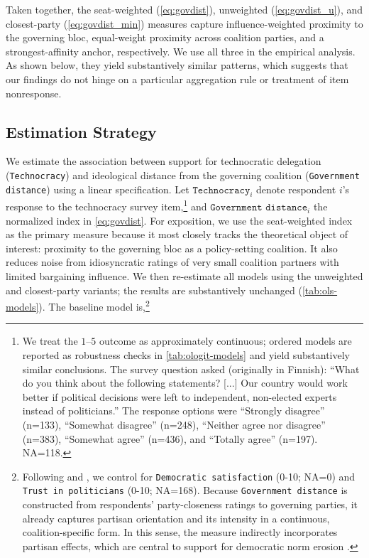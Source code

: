 \documentclass[11pt]{article}\usepackage[]{graphicx}\usepackage[]{xcolor}
\begin{document}
Taken together, the seat-weighted (\autoref{eq:govdist}), unweighted (\autoref{eq:govdist_u}), and closest-party (\autoref{eq:govdist_min}) measures capture influence-weighted proximity to the governing bloc, equal-weight proximity across coalition parties, and a strongest-affinity anchor, respectively. We use all three in the empirical analysis. As shown below, they yield substantively similar patterns, which suggests that our findings do not hinge on a particular aggregation rule or treatment of item nonresponse.

\subsection{Estimation Strategy}

We estimate the association between support for technocratic delegation (\texttt{Technocracy}) and ideological distance from the governing coalition (\texttt{Government distance}) using a linear specification. Let $\texttt{Technocracy}_i$ denote respondent $i$'s response to the technocracy survey item,\footnote{We treat the $1$--$5$ outcome as approximately continuous; ordered models are reported as robustness checks in \autoref{tab:ologit-models} and yield substantively similar conclusions. The survey question asked (originally in Finnish): ``What do you think about the following statements? [...] Our country would work better if political decisions were left to independent, non-elected experts instead of politicians.'' The response options were ``Strongly disagree'' (n=133), ``Somewhat disagree'' (n=248), ``Neither agree nor disagree'' (n=383), ``Somewhat agree'' (n=436), and ``Totally agree'' (n=197). NA=118.} and ${\texttt{Government distance}}_i$ the normalized index in \autoref{eq:govdist}.
For exposition, we use the seat-weighted index as the primary measure because it most closely tracks the theoretical object of interest: proximity to the governing bloc as a policy-setting coalition. It also reduces noise from idiosyncratic ratings of very small coalition partners with limited bargaining influence. We then re-estimate all models using the unweighted and closest-party variants; the results are substantively unchanged (\autoref{tab:ols-models}). The baseline model is,\footnote{Following \textcite[434]{Armingeon2014} and \textcite[102]{Chiru2022}, we control for \texttt{Democratic satisfaction} (0-10; NA=0) and \texttt{Trust in politicians} (0-10; NA=168). Because \texttt{Government distance} is constructed from respondents’ party-closeness ratings to governing parties, it already captures partisan orientation and its intensity in a continuous, coalition-specific form. In this sense, the measure indirectly incorporates partisan effects, which are central to support for democratic norm erosion \parencite{Kingzette2021,Foa2025}.}
\end{document}
